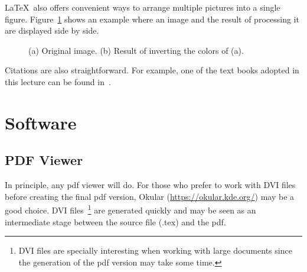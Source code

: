 \documentclass[a4paper, twoside, english]{article}
\begin{document}
{\LaTeX\ also offers convenient ways to arrange multiple pictures into a single figure.
Figure~\ref{fig:inversion} shows an example where an image and the result of processing it are displayed side by side.
\begin{figure}[ht]
 \centerline
 {
  \qquad
 }
 \caption[Color inversion]{(a) Original image. (b) Result of inverting the colors of (a).}
 \label{fig:inversion}
\end{figure}

Citations are also straightforward.
For example, one of the text books adopted in this lecture can be found in~\cite{Stricker2021}. 

\section{Software}

\subsection{PDF Viewer}
In principle, any pdf viewer will do.
For those who prefer to work with DVI files before creating the final pdf version, Okular (\url{https://okular.kde.org/}) may be a good choice.
DVI files~\footnote{DVI files are specially interesting when working with large documents since the generation of the pdf version may take some time.} are generated quickly and may be seen as an 
intermediate stage between the source file (.tex) and the pdf.

}
\end{document}
